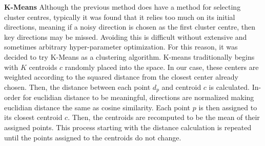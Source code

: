 \noindent \textbf{K-Means} Although the previous method does have a method for selecting cluster centres, typically it was found that it relies too much on its initial directions, meaning if a noisy direction is chosen as the first cluster centre, then key directions may be missed. Avoiding this is difficult without extensive and sometimes arbitrary hyper-parameter optimization. For this reason, it was decided to try K-Means as a clustering algorithm. K-means traditionally begins with $K$ centroids $c$ randomly placed into the space. In our case, these centers are weighted according to the squared distance from the closest center already chosen. \cite{Arthur} %
Then, the distance between each point $d_p$ and centroid $c$ is calculated. In-order for euclidian distance to be meaningful, directions are normalized making euclidian distance the same as cosine similarity. Each point $p$ is then assigned to its closest centroid $c$. Then, the centroids are recomputed to be the mean of their assigned points. This process starting with the distance calculation is repeated until the points assigned to the centroids do not change. 





